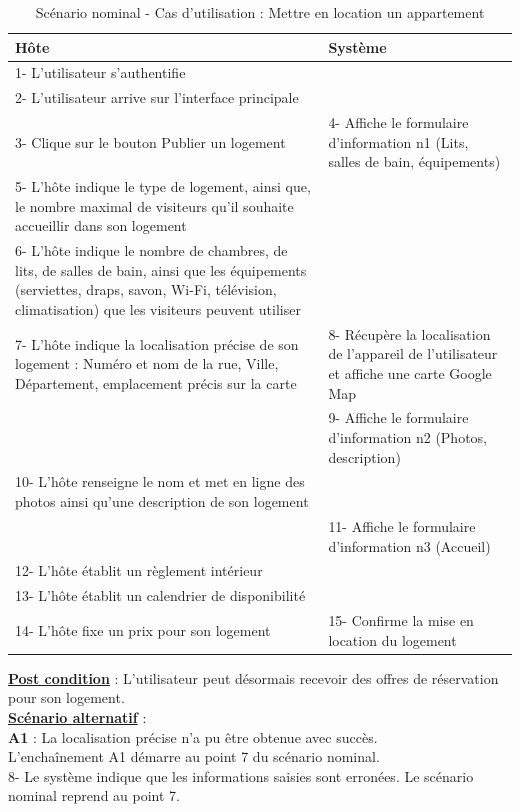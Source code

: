 \begin{table}[H]
\begin{center}
\begin{tabular}{|p{8cm}|p{8cm}|}
\hline
Hôte & Système\\
\hline
1- L’utilisateur s’authentifie & $ $\\
\hline
2- L’utilisateur arrive sur l’interface principale  & $ $\\	
\hline
3- Clique sur le bouton Publier un logement & 4- Affiche le formulaire d’information n1 (Lits, salles de bain, équipements)\\
\hline
5- L'hôte indique le type de logement, ainsi que, le nombre maximal de visiteurs qu’il souhaite accueillir dans son logement & $ $\\
\hline
6- L'hôte indique le nombre de chambres, de lits, de salles de bain, ainsi que les équipements (serviettes, draps, savon, Wi-Fi, télévision, climatisation) que les visiteurs peuvent utiliser & $ $\\
\hline
7- L'hôte indique la localisation précise de son logement : Numéro et nom de la rue, Ville, Département, emplacement précis sur la carte & 8- Récupère la localisation de l’appareil de l’utilisateur et affiche une carte Google Map\\
\hline
$ $ & 9- Affiche le formulaire d’information n2 (Photos, description)\\
\hline
10- L'hôte renseigne le nom et met en ligne des photos ainsi qu’une description de son logement	 & $ $\\
\hline
$ $ & 11- Affiche le formulaire d’information n3 (Accueil)\\
\hline
12- L'hôte établit un règlement intérieur & $ $\\
\hline
13- L'hôte établit un calendrier de disponibilité	 & $ $\\
\hline
14- L'hôte fixe un prix pour son logement & 15- Confirme la mise en location du logement\\
\hline
\end{tabular}
\caption{Scénario nominal - Cas d'utilisation : Mettre en location un appartement}
\end{center}
\end{table}


\begin{flushleft}
{\underline{\textbf{Post condition}}} : L’utilisateur peut désormais recevoir des offres de réservation pour son logement.
\\\underline{\textbf{Scénario alternatif}} :
\\\textbf{A1} : La localisation précise n’a pu être obtenue avec succès.
\\L'enchaînement A1 démarre au point 7 du scénario nominal.
\\8- Le système indique que les informations saisies sont erronées. Le scénario nominal reprend au point 7.
\end{flushleft}

